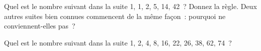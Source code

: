 \begin{question}\label{iq:iv1:sequences-patterns-and-aptitude:29}
Quel est le nombre suivant dans la suite 1, 1, 2, 5, 14, 42~? Donnez la règle. Deux autres suites bien connues commencent de la même façon~: pourquoi ne conviennent-elles pas~?
\end{question}

\begin{question}\label{iq:iv1:sequences-patterns-and-aptitude:30}
Quel est le nombre suivant dans la suite 1, 2, 4, 8, 16, 22, 26, 38, 62, 74~?
\end{question}
